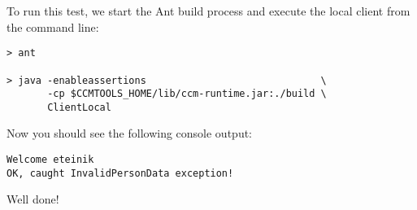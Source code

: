 To run this test, we start the Ant build process and execute the local client
from the command line:
\begin{footnotesize}
\begin{verbatim}
> ant

> java -enableassertions                              \
       -cp $CCMTOOLS_HOME/lib/ccm-runtime.jar:./build \
       ClientLocal
\end{verbatim}
\end{footnotesize}

Now you should see the following console output:
\begin{footnotesize}
\begin{verbatim}
Welcome eteinik
OK, caught InvalidPersonData exception!
\end{verbatim}
\end{footnotesize}

Well done! 

\newpage
